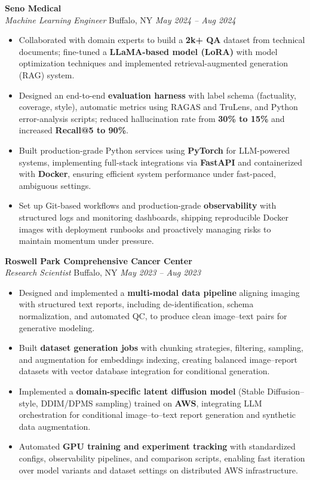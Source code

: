 \vspace*{-1pt}
\item \textbf{Seno Medical}\\
\textit{Machine Learning Engineer} \hfill Buffalo, NY \quad \textit{May 2024 -- Aug 2024}
\vspace*{-3pt}
\begin{itemize}[leftmargin=0.2in, topsep=1pt]
  \item Collaborated with domain experts to build a \textbf{2k+ QA} dataset from technical documents; fine-tuned a \textbf{LLaMA-based model (LoRA)} with model optimization techniques and implemented retrieval-augmented generation (RAG) system.
  \item Designed an end-to-end \textbf{evaluation harness} with label schema (factuality, coverage, style), automatic metrics using RAGAS and TruLens, and Python error-analysis scripts; reduced hallucination rate from \textbf{30\% to 15\%} and increased \textbf{Recall@5 to 90\%}.
  \item Built production-grade Python services using \textbf{PyTorch} for LLM-powered systems, implementing full-stack integrations via \textbf{FastAPI} and containerized with \textbf{Docker}, ensuring efficient system performance under fast-paced, ambiguous settings.
  \item Set up Git-based workflows and production-grade \textbf{observability} with structured logs and monitoring dashboards, shipping reproducible Docker images with deployment runbooks and proactively managing risks to maintain momentum under pressure.
\end{itemize}

\vspace*{-1pt}
\item \textbf{Roswell Park Comprehensive Cancer Center}\\
\textit{Research Scientist} \hfill Buffalo, NY \quad \textit{May 2023 -- Aug 2023}
\vspace*{-3pt}
\begin{itemize}[leftmargin=0.2in, topsep=1pt]
  \item Designed and implemented a \textbf{multi-modal data pipeline} aligning imaging with structured text reports, including de-identification, schema normalization, and automated QC, to produce clean image–text pairs for generative modeling.
  \item Built \textbf{dataset generation jobs} with chunking strategies, filtering, sampling, and augmentation for embeddings indexing, creating balanced image–report datasets with vector database integration for conditional generation.
  \item Implemented a \textbf{domain-specific latent diffusion model} (Stable Diffusion–style, DDIM/DPMS sampling) trained on \textbf{AWS}, integrating LLM orchestration for conditional image–to–text report generation and synthetic data augmentation.
  \item Automated \textbf{GPU training and experiment tracking} with standardized configs, observability pipelines, and comparison scripts, enabling fast iteration over model variants and dataset settings on distributed AWS infrastructure.
\end{itemize}
